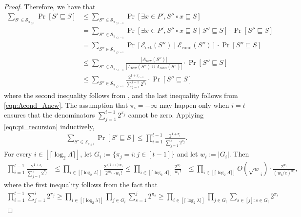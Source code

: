 \documentclass[11pt,letterpaper]{article}
\theoremstyle{plain}
\theoremstyle{definition}
\theoremstyle{remark}
\newcommand{\Econd}{\ensuremath{\mathcal{E}_{\mathrm{cond}}}\xspace}
\newcommand{\Eextend}{\ensuremath{\mathcal{E}_{\mathrm{ext}}}\xspace}
\newcommand{\Acond}{\ensuremath{A_{\mathrm{cond}}}\xspace}
\newcommand{\Anew}{\ensuremath{A_{\mathrm{new}}}\xspace}
\newcommand{\Spi}[1]{\ensuremath{\mathcal{S}_{\pi_{#1}}}\xspace}
\begin{document}
\begin{proof}
    Therefore, we have that 
    \begin{align}
        \sum_{S'\in \Spi{\leq i}}\Pr[S'\sqsubseteq S] 
        &\leq  \sum_{S''\in \Spi{\leq i-1}} \Pr[\exists x\in P', S''\circ x\sqsubseteq S]\nonumber\\
        &=\sum_{S''\in \Spi{\leq i-1}} \Pr[\exists x\in P', S''\circ x\sqsubseteq S\mid S''\sqsubseteq S] \cdot \Pr[S''\sqsubseteq S]\nonumber\\
        &= \sum_{S''\in \Spi{\leq i-1}} \Pr[\Eextend(S'')\mid \Econd(S'')]\cdot \Pr[S''\sqsubseteq S]
\nonumber\\
        &\leq \sum_{S''\in \Spi{\leq i-1}} \frac{|\Anew(S'')|}{|\Anew(S'')\cup \Acond(S'')|} \cdot \Pr[S''\sqsubseteq S] \nonumber \\
        &\leq \sum_{S''\in \Spi{\leq i-1}} \frac{2^{1 + \pi_{i - 1}}}{\sum_{j=1}^{i - 1} 2^{\pi_j}} \cdot \Pr[S''\sqsubseteq S] \label{eqn:pi_recursion}
    \end{align}
    where the second inequality follows from ,
    and the last inequality follows from \eqref{eqn:Acond_Anew}.
    The assumption that $\pi_i = -\infty$ may happen only when $i = t$
    ensures that the denominators $\sum_{j = 1}^{i - 1}2^{\pi_j}$ cannot be zero.
    Applying \eqref{eqn:pi_recursion} inductively,
    \begin{align*}
        \sum_{S'\in \Spi{\leq t}}\Pr[S'\sqsubseteq S] 
        \leq \prod_{i = 1}^{t - 1} \frac{2^{1 + \pi_{i}}}{\sum_{j=1}^{i} 2^{\pi_j}}.
    \end{align*}
    For every $i \in [\lceil \log_2 \Lambda \rceil]$,
    let $G_i := \{ \pi_j = i : j \in [t - 1] \} $ and let $w_i := |G_i|$.
    Then 
    \begin{align*}
        \prod_{i = 1}^{t - 1} \frac{2^{1 + \pi_{i}}}{\sum_{j=1}^{i} 2^{\pi_j}}
        &\leq \prod_{i \in [\lceil \log_2 \Lambda \rceil]} \frac{ 2^{(1 + i)w_i} }{2^{i w_i} \cdot w_i!}
        \leq \prod_{i \in [\lceil \log_2 \Lambda \rceil]} \frac{ 2^{w_i} }{w_i!}
&\leq \prod_{i \in [\lceil \log_2 \Lambda \rceil]} O(\sqrt w_i) \cdot \frac{ 2^{w_i} }{(w_i / e)^{w_i}},
    \end{align*}
    where the first inequality follows from the fact that
    \begin{align*}
        \prod_{i = 1}^{t - 1} \sum_{j = 1}^i 2^{\pi_j}
        \geq \prod_{i \in [\lceil \log_2 \lambda \rceil]} \prod_{j  \in G_i} \sum_{s = 1}^j 2^{\pi_s}
        \geq \prod_{i \in [\lceil \log_2 \lambda \rceil]} \prod_{j  \in G_i} \sum_{s \in [j] : s \in G_i} 2^{\pi_s}

\end{align*}
\end{proof}
\end{document}
